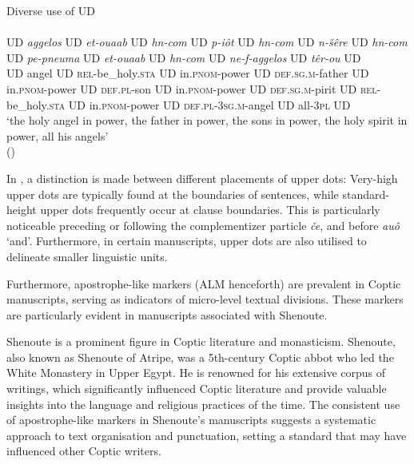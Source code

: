 \documentclass[output=paper,colorlinks,citecolor=brown ,chinesefont]{langscibook}
\begin{document}
\begin{exe}
\ex\label{diverse} Diverse use of UD \\
\glll {}                         \\	
UD \textit{aggelos} UD \textit{et-ouaab} UD \textit{hn-com} UD \textit{p-iôt} UD \textit{hn-com} UD \textit{n-šêre} UD \textit{hn-com} UD \textit{pe-pneuma} UD \textit{et-ouaab} UD \textit{hn-com} UD \textit{ne-f-aggelos} UD \textit{têr-ou} UD \\
UD angel UD \textsc{rel}-be{\_}holy.\textsc{sta} UD in.\textsc{pnom}-power UD \textsc{def}.\textsc{sg}.\textsc{m}-father UD in.\textsc{pnom}-power UD \textsc{def}.\textsc{pl}-son UD in.\textsc{pnom}-power UD \textsc{def}.\textsc{sg}.\textsc{m}-pirit UD \textsc{rel}-be{\_}holy.\textsc{sta} UD in.\textsc{pnom}-power UD \textsc{def}.\textsc{pl}-3\textsc{sg}.\textsc{m}-angel UD all-3\textsc{pl} UD \\
\glt  ‘the holy angel in power, the father in power, the sons in power, the holy spirit in power, all his angels' \\
\hspace*{\fill}()
\end{exe}

In \citet{quecke}, a distinction is made between different placements of upper dots: Very-high upper dots are typically found at the boundaries of sentences, while standard-height upper dots frequently occur at clause boundaries. This is particularly noticeable preceding or following the complementizer particle  \textit{če}, and before  \textit{auô} ‘and'. Furthermore, in certain manuscripts, upper dots are also utilised to delineate smaller linguistic units.




Furthermore, apostrophe-like markers (ALM henceforth) are prevalent in Coptic manuscripts, serving as indicators of micro-level textual divisions. These markers are particularly evident in manuscripts associated with Shenoute. 


Shenoute is a prominent figure in Coptic literature and monasticism. Shenoute, also known as Shenoute of Atripe, was a 5th-century Coptic abbot who led the White Monastery in Upper Egypt. He is renowned for his extensive corpus of writings, which significantly influenced Coptic literature and provide valuable insights into the language and religious practices of the time. The consistent use of apostrophe-like markers in Shenoute's manuscripts suggests a systematic approach to text organisation and punctuation, setting a standard that may have influenced other Coptic writers. 
\end{document}
